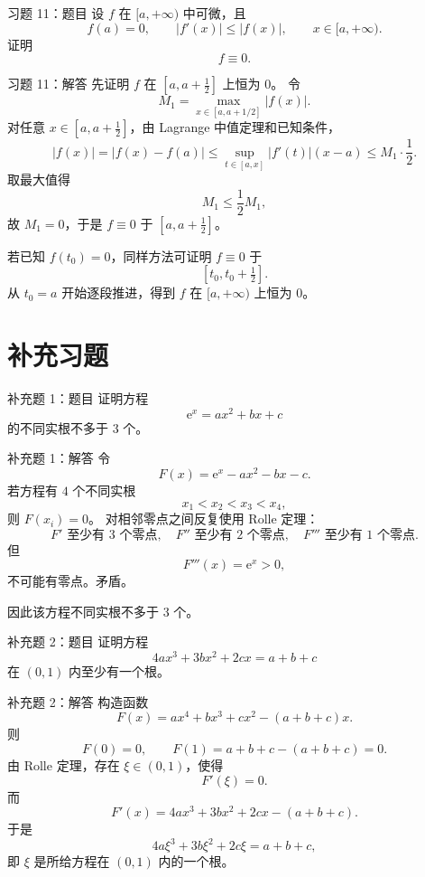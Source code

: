 \documentclass[aspectratio=169,10pt]{ctexbeamer}
\newcommand{\ee}{\mathrm{e}}
\begin{document}
\begin{frame}[t]{习题 11：题目}
\small
设 $f$ 在 $[a,+\infty)$ 中可微，且
\[
  f(a)=0,\qquad |f'(x)|\le |f(x)|,\qquad x\in[a,+\infty).
\]
证明
\[
  f\equiv0.
\]
\end{frame}

\begin{frame}[t]{习题 11：解答}
\footnotesize
先证明 $f$ 在 $[a,a+\frac12]$ 上恒为 $0$。
令
\[
  M_1=\max_{x\in[a,a+1/2]}|f(x)|.
\]
对任意 $x\in[a,a+\frac12]$，由 Lagrange 中值定理和已知条件，
\[
  |f(x)|=|f(x)-f(a)|
  \le \sup_{t\in[a,x]}|f'(t)|(x-a)
  \le M_1\cdot\frac12.
\]
取最大值得
\[
  M_1\le\frac12M_1,
\]
故 $M_1=0$，于是 $f\equiv0$ 于 $[a,a+\frac12]$。

若已知 $f(t_0)=0$，同样方法可证明 $f\equiv0$ 于
\[
  [t_0,t_0+\tfrac12].
\]
从 $t_0=a$ 开始逐段推进，得到 $f$ 在 $[a,+\infty)$ 上恒为 $0$。
\end{frame}

\section{补充习题}

\begin{frame}[t]{补充题 1：题目}
\small
证明方程
\[
  \ee^x=ax^2+bx+c
\]
的不同实根不多于 $3$ 个。
\end{frame}

\begin{frame}[t]{补充题 1：解答}
\small
令
\[
  F(x)=\ee^x-ax^2-bx-c.
\]
若方程有 $4$ 个不同实根
\[
  x_1<x_2<x_3<x_4,
\]
则 $F(x_i)=0$。
对相邻零点之间反复使用 Rolle 定理：
\[
  F' \text{ 至少有 }3\text{ 个零点},\quad
  F'' \text{ 至少有 }2\text{ 个零点},\quad
  F''' \text{ 至少有 }1\text{ 个零点}.
\]
但
\[
  F'''(x)=\ee^x>0,
\]
不可能有零点。矛盾。

因此该方程不同实根不多于 $3$ 个。
\end{frame}

\begin{frame}[t]{补充题 2：题目}
\small
证明方程
\[
  4ax^3+3bx^2+2cx=a+b+c
\]
在 $(0,1)$ 内至少有一个根。
\end{frame}

\begin{frame}[t]{补充题 2：解答}
\small
构造函数
\[
  F(x)=ax^4+bx^3+cx^2-(a+b+c)x.
\]
则
\[
  F(0)=0,\qquad
  F(1)=a+b+c-(a+b+c)=0.
\]
由 Rolle 定理，存在 $\xi\in(0,1)$，使得
\[
  F'(\xi)=0.
\]
而
\[
  F'(x)=4ax^3+3bx^2+2cx-(a+b+c).
\]
于是
\[
  4a\xi^3+3b\xi^2+2c\xi=a+b+c,
\]
即 $\xi$ 是所给方程在 $(0,1)$ 内的一个根。
\end{frame}
\end{document}
